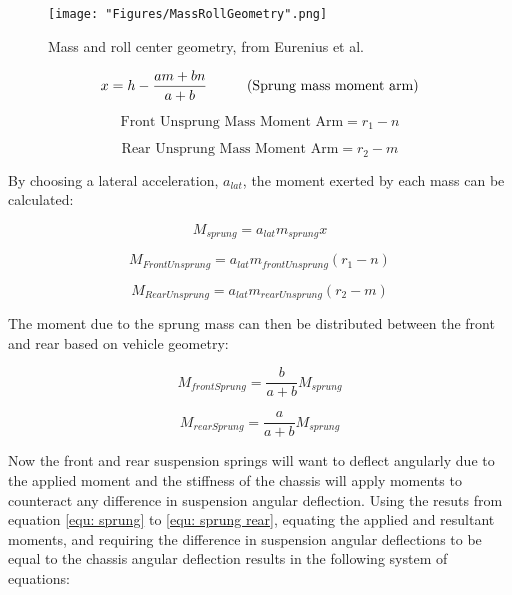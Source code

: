 \documentclass[a4paper]{article}
\newcommand\tab[1][1cm]{\hspace*{#1}}
\numberwithin{equation}{section}
\begin{document}
\begin{figure}[h]
	\begin{center}
		\texttt{[image: "Figures/MassRollGeometry".png]}
	\end{center}
	
	\caption{Mass and roll center geometry, from Eurenius et al. \cite{Chalmers}}
	\label{fig: MassRollGeometry}
\end{figure}

\begin{equation}
x = h - \frac{am+bn}{a+b} \text{\tab(Sprung mass moment arm)}
\end{equation}

\begin{equation}
\text{Front Unsprung Mass Moment Arm}=r_1-n
\end{equation}

\begin{equation}
\text{Rear Unsprung Mass Moment Arm}=r_2-m
\end{equation}

By choosing a lateral acceleration, $a_{lat}$, the moment exerted by each mass can be calculated:

\begin{equation}
M_{sprung} = a_{lat} m_{sprung} x
\label{equ: sprung}
\end{equation}

\begin{equation}
M_{FrontUnsprung} = a_{lat} m_{frontUnsprung} (r_1-n)
\label{equ: unsprung front}
\end{equation}

\begin{equation}
M_{RearUnsprung}=a_{lat} m_{rearUnsprung} (r_2-m)
\label{equ: unsprung rear}
\end{equation}

The moment due to the sprung mass can then be distributed between the front and rear based on vehicle geometry:

\begin{equation}
M_{frontSprung} = \frac{b}{a+b} M_{sprung}
\label{equ: sprung front}
\end{equation}

\begin{equation}
M_{rearSprung} = \frac{a}{a+b} M_{sprung}
\label{equ: sprung rear}
\end{equation}

Now the front and rear suspension springs will want to deflect angularly due to the applied moment and the stiffness of the chassis will apply moments to counteract any difference in suspension angular deflection. Using the resuts from equation \ref{equ: sprung} to \ref{equ: sprung rear}, equating the applied and resultant moments, and requiring the difference in suspension angular deflections to be equal to the chassis angular deflection results in the following system of equations:
\end{document}
